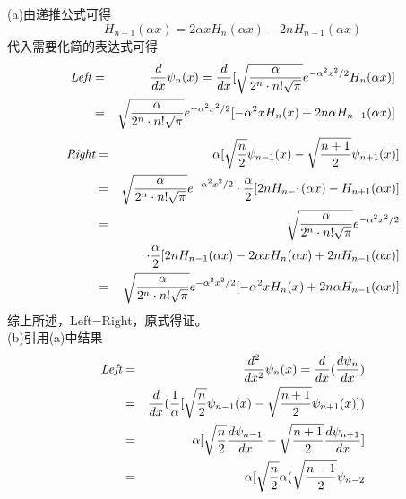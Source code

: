 \documentclass[a4paper]{article}
\begin{document}
\begin{CJK*}{UTF8}{song}
{    (a)由递推公式可得
    $$H_{n+1}(\alpha x) = 2\alpha x H_{n}(\alpha x) - 2nH_{n-1}(\alpha x)$$
    代入需要化简的表达式可得
    \begin{eqnarray}
        \emph{Left} & = & \frac{d}{dx}\psi_{n}(x)
                        = \frac{d}{dx}[\sqrt{\frac{\alpha}{2^{n}\cdot n!\sqrt{\pi}}}
                        e^{-\alpha^{2}x^{2}/2}H_{n}(\alpha x)]\nonumber\\
                    & = &   \sqrt{\frac{\alpha}{2^{n}\cdot n!\sqrt{\pi}}}
                        e^{-\alpha^{2}x^{2}/2}[-\alpha^{2}x H_{n}(x) + 2n\alpha H_{n-1}(\alpha x)]\nonumber\\
    \end{eqnarray}
    \begin{eqnarray}
        \emph{Right}& = & {\alpha}[\sqrt{\frac{n}{2}}\psi_{n-1}(x)
                        - \sqrt{\frac{n + 1}{2}}\psi_{n+1}(x)]\nonumber\\
                    & = & \sqrt{\frac{\alpha}{2^{n}\cdot n!\sqrt{\pi}}}e^{-\alpha^{2}x^{2}/2}
                        \cdot \frac{\alpha}{2}[2 n H_{n-1}(\alpha x) - H_{n+1}(\alpha x)]\nonumber\\
                    & = & \sqrt{\frac{\alpha}{2^{n}\cdot n!\sqrt{\pi}}}e^{-\alpha^{2}x^{2}/2}\nonumber\\
                    &   & \cdot \frac{\alpha}{2}[2 n H_{n-1}(\alpha x)
                        - 2\alpha x H_{n}(\alpha x) + 2nH_{n-1}(\alpha x)]\nonumber\\
                    & = &   \sqrt{\frac{\alpha}{2^{n}\cdot n!\sqrt{\pi}}}
                        e^{-\alpha^{2}x^{2}/2}[-\alpha^{2}x H_{n}(x) + 2n\alpha H_{n-1}(\alpha x)]\nonumber
    \end{eqnarray}
    综上所述，Left=Right，原式得证。\\[12pt]
    (b)引用(a)中结果
    \begin{eqnarray}
        \emph{Left} & = & \frac{d^{2}}{d x^{2}}\psi_{n}(x)
                        = \frac{d}{d x}(\frac{d \psi_{n}}{d x})\nonumber\\
                    & = & \frac{d}{d x}(\frac{1}{\alpha}[\sqrt{\frac{n}{2}}\psi_{n-1}(x)
                        - \sqrt{\frac{n + 1}{2}}\psi_{n+1}(x)])\nonumber\\
                    & = & {\alpha}[\sqrt{\frac{n}{2}}\frac{d\psi_{n-1}}{d x}
                        - \sqrt{\frac{n + 1}{2}}\frac{d\psi_{n+1}}{d x}]\nonumber\\
                    & = &{\alpha}[\sqrt{\frac{n}{2}}{\alpha}(\sqrt{\frac{n-1}{2}}\psi_{n-2}

\end{eqnarray}}
\end{CJK*}
\end{document}
